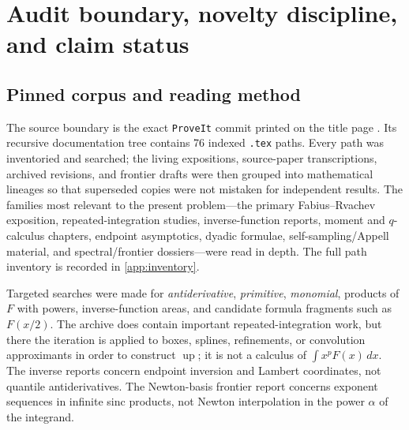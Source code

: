 \documentclass[11pt,oneside]{article}
\numberwithin{equation}{section}
\theoremstyle{definition}
\theoremstyle{remark}
\newcommand{\Up}{\operatorname{up}}
\begin{document}
\begin{abstract}
Exact reciprocal-dyadic formulae, Thue--Morse and $q$-binomial substitutions, numerical
experiments, a negative-power tail model driven by the proved log-periodic endpoint
asymptotic, conjectures, a current Lean crosswalk, and a narrowed formalization plan complete
the report.  All statements are labeled as inherited, proved here, numerical, or
conjectural.  Priority outside the pinned corpus is not asserted.
\end{abstract}

\tableofcontents
\clearpage

\section{Audit boundary, novelty discipline, and claim status}
\label{sec:audit}

\subsection{Pinned corpus and reading method}

The source boundary is the exact \texttt{ProveIt} commit printed on the title page \cite{proveit}.  Its recursive documentation
tree contains 76 indexed \texttt{.tex} paths.  Every path was inventoried and searched; the
living expositions, source-paper transcriptions, archived revisions, and frontier drafts were
then grouped into mathematical lineages so that superseded copies were not mistaken for
independent results.  The families most relevant to the present problem---the primary
Fabius--Rvachev exposition, repeated-integration studies, inverse-function reports, moment and
$q$-calculus chapters, endpoint asymptotics, dyadic formulae, self-sampling/Appell material,
and spectral/frontier dossiers---were read in depth.  The full path inventory is recorded in
\cref{app:inventory}.

Targeted searches were made for \emph{antiderivative}, \emph{primitive}, \emph{monomial},
products of $F$ with powers, inverse-function areas, and candidate formula fragments such as
$F(x/2)$.  The archive does contain important repeated-integration work, but there the
iteration is applied to boxes, splines, refinements, or convolution approximants in order to
construct $\Up$; it is not a calculus of $\int x^pF(x)\,dx$.  The inverse reports concern
endpoint inversion and Lambert coordinates, not quantile antiderivatives.  The Newton-basis
frontier report concerns exponent sequences in infinite sinc products, not Newton interpolation
in the power $\alpha$ of the integrand.
\end{document}
